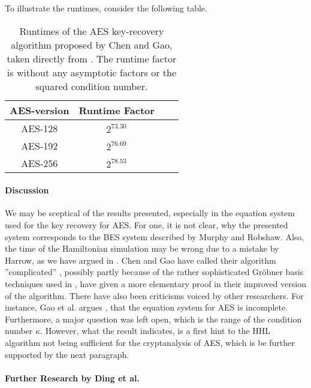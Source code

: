 To illustrate the runtimes, consider the following table.

\begin{table}[!hbtp]
    \centering
    \begin{tabular}{|c|c|c|c|}
        \hline
        AES-version & Runtime Factor\\
        \hline
        AES-128 & \(2^{73.30}\)\\
        AES-192 & \(2^{76.69}\)\\
        AES-256 & \(2^{78.53}\)\\
        \hline
    \end{tabular}
    \caption{Runtimes of the AES key-recovery algorithm proposed by Chen and Gao, taken directly from \cite[p. 26]{Chen2017}. The runtime factor is without any asymptotic factors or the squared condition number.}
    \label{chen_gao_aes_results}
\end{table}

\paragraph*{Discussion} We may be sceptical of the results presented, especially in the equation system used for the key recovery for AES. For one, it is not clear, why the presented system corresponds to the BES system described by Murphy and Robshaw. Also, the time of the Hamiltonian simulation may be wrong due to a mistake by Harrow, as we have argued in . Chen and Gao have called their algorithm ''complicated'' \cite[p. 5]{Chen2017}, possibly partly because of the rather sophisticated Gröbner basis techniques used in \cite[pp. 11-15]{Chen2017}, \cite[p. 2]{Ding2021} have given a more elementary proof in their improved version of the algorithm. There have also been criticisms voiced by other researchers. For instance, Gao et al. argues \cite[p. 2]{Gao2022}, that the equation system for AES is incomplete. Furthermore, a major question was left open, which is the range of the condition number \(\kappa\). However, what the result indicates, is a first hint to the HHL algorithm not being sufficient for the cryptanalysis of AES, which is be further supported by the next paragraph.

\paragraph*{Further Research by Ding et al.} \phantom{}\\\phantom{}


